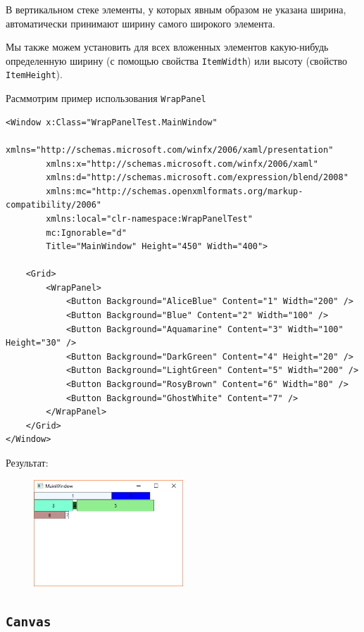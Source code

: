 В вертикальном стеке элементы, у которых явным образом не указана ширина, автоматически принимают ширину самого широкого элемента.

Мы также можем установить для всех вложенных элементов какую-нибудь определенную ширину (с помощью свойства \texttt{ItemWidth}) или высоту (свойство \texttt{ItemHeight}).

Расммотрим пример использования \texttt{WrapPanel}

\begin{verbatim}
<Window x:Class="WrapPanelTest.MainWindow"
        xmlns="http://schemas.microsoft.com/winfx/2006/xaml/presentation"
        xmlns:x="http://schemas.microsoft.com/winfx/2006/xaml"
        xmlns:d="http://schemas.microsoft.com/expression/blend/2008"
        xmlns:mc="http://schemas.openxmlformats.org/markup-compatibility/2006"
        xmlns:local="clr-namespace:WrapPanelTest"
        mc:Ignorable="d"
        Title="MainWindow" Height="450" Width="400">

    <Grid>
        <WrapPanel>
            <Button Background="AliceBlue" Content="1" Width="200" />
            <Button Background="Blue" Content="2" Width="100" />
            <Button Background="Aquamarine" Content="3" Width="100" Height="30" />
            <Button Background="DarkGreen" Content="4" Height="20" />
            <Button Background="LightGreen" Content="5" Width="200" />
            <Button Background="RosyBrown" Content="6" Width="80" />
            <Button Background="GhostWhite" Content="7" />
        </WrapPanel>
    </Grid>
</Window>
\end{verbatim}

Результат:
\begin{figure}[H]
\centering
\includegraphics[width=0.5\textwidth]{manager_wrappanel.png}
\end{figure}

\subsection{\texttt{Canvas}}

